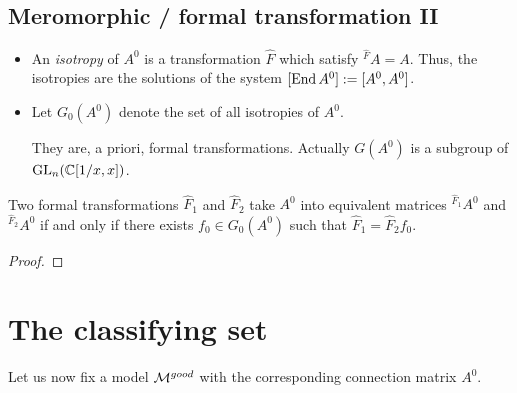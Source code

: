 \subsection{Meromorphic / formal transformation II}
\begin{defn}
  \begin{itemize}
    \item An \emph{isotropy} of $A^0$ is a transformation $\hat F$ which
      satisfy ${}^{\hat F}\!A=A$. Thus, the isotropies are the solutions of the
      system $[\operatorname{End} A^0]:=[A^0,A^0]$.
    \item Let $G_0(A^0)$ denote the set of all isotropies of $A^0$.
      \begin{comment}
        In the nice case this is only $T$?
      \end{comment}
      \begin{rem}
        They are, a priori, formal transformations. Actually $G(A^0)$ is a
        subgroup of $\operatorname{GL}_n(\mathbb{C}[1/x,x])$.
      \end{rem}
  \end{itemize}
\end{defn}
\begin{lem}
  Two formal transformations $\hat F_1$ and $\hat F_2$ take $A^0$ into
  equivalent matrices ${}^{\hat F_1}\!A^0$ and  ${}^{\hat F_2}\!A^0$ if and
  only if there exists $f_0\in G_0(A^0)$ such that $\hat F_1=\hat F_2f_0$.
\end{lem}
\begin{proof}
  \TODO
\end{proof}

\section{The classifying set}
Let us now fix a model $\mathcal{M}^{good}$ with the corresponding connection matrix
$A^0$.
\begin{comment}
  \begin{itemize}
    \item \cite{thboalch} p.6
      \begin{itemize}
        \item \cite{boalch} p.19
      \end{itemize}
    \item \cite{Loday1994} p.852
    \item \cite{sabbah2007isomonodromic} p.111
  \end{itemize}
\end{comment}
\begin{comment}
  Roughly speaking, we want to understand the difference between the formal
  Classification of meromorphic connections and the finer meromorphic
  classification.
  It is natural to fix a model $A^0$ and restrict to the meromorphic connections
  formally isomorphic to this model.
\end{comment}


